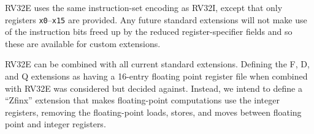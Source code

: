 RV32E uses the same instruction-set encoding as RV32I, except that
only registers {\tt x0}--{\tt x15} are provided.  Any future standard
extensions will not make use of the instruction bits freed up by the
reduced register-specifier fields and so these are available for
custom extensions.

\begin{commentary}
RV32E can be combined with all current standard extensions. Defining the F, D,
and Q extensions as having a 16-entry floating point register file when
combined with RV32E was considered but decided against. Instead, we intend to
define a ``Zfinx'' extension that makes floating-point computations use the
integer registers, removing the floating-point loads, stores, and moves between
floating point and integer registers.
\end{commentary}
